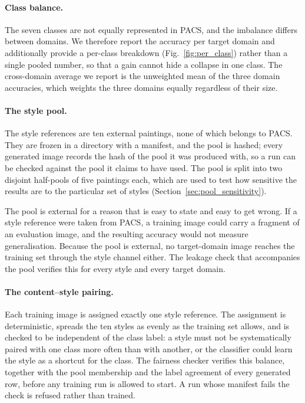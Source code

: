 \paragraph{Class balance.}
The seven classes are not equally represented in PACS, and the imbalance
differs between domains. We therefore report the accuracy per target domain
and additionally provide a per-class breakdown (Fig.~\ref{fig:per_class})
rather than a single pooled number, so that a gain cannot hide a collapse in
one class. The cross-domain average we report is the unweighted mean of the
three domain accuracies, which weights the three domains equally regardless
of their size.

\paragraph{The style pool.}
The style references are ten external paintings, none of which belongs to
PACS. They are frozen in a directory with a manifest, and the pool is
hashed; every generated image records the hash of the pool it was produced
with, so a run can be checked against the pool it claims to have used. The
pool is split into two disjoint half-pools of five paintings each, which
are used to test how sensitive the results are to the particular set of
styles (Section~\ref{sec:pool_sensitivity}).

The pool is external for a reason that is easy to state and easy to get
wrong. If a style reference were taken from PACS, a training image could
carry a fragment of an evaluation image, and the resulting accuracy would
not measure generalisation. Because the pool is external, no target-domain
image reaches the training set through the style channel either. The
leakage check that accompanies the pool verifies this for every style and
every target domain.

\paragraph{The content--style pairing.}
Each training image is assigned exactly one style reference. The assignment
is deterministic, spreads the ten styles as evenly as the training set
allows, and is checked to be independent of the class label: a style must
not be systematically paired with one class more often than with another,
or the classifier could learn the style as a shortcut for the class. The
fairness checker verifies this balance, together with the pool membership
and the label agreement of every generated row, before any training run is
allowed to start. A run whose manifest fails the check is refused rather
than trained.

